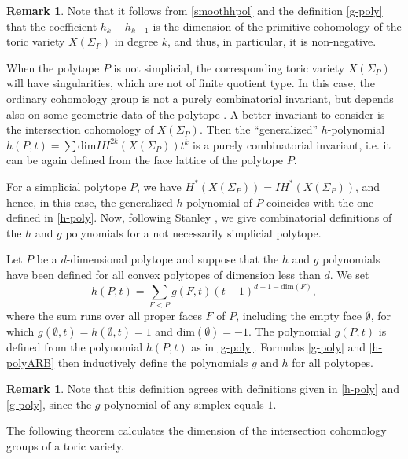 \documentclass[11pt]{article}
\theoremstyle{definition}
\newtheorem{rema}[theo]{Remark}
\numberwithin{equation}{section}
\begin{document}
\begin{rema}
	Note that it follows from \eqref{smoothhpol} and the definition 
	\eqref{g-poly} that the coefficient $h_k-h_{k-1}$ is the dimension of the 
	primitive cohomology of the toric variety $X(\Sigma_P)$ in degree $k$, and 
	thus, in particular, it is non-negative.
\end{rema}


When the polytope $P$ is not simplicial, the corresponding toric variety 
$X(\Sigma_P)$ will have singularities, which are not of finite quotient type. 
In this case, the 
ordinary cohomology group is not a purely combinatorial invariant, but depends 
also on some geometric data of the polytope \cite{McConnel}. A better invariant 
to consider is the intersection cohomology of $X(\Sigma_P)$.  
Then the ``generalized'' $h$-polynomial $h(P, t) = 
\sum\mathrm{dim}IH^{2k}(X(\Sigma_P))t^k$ is a purely combinatorial invariant, 
i.e.  it can be again defined from the face lattice of the polytope $P$.  

For a simplicial polytope $P$, we have $H^*(X(\Sigma_P))=IH^*(X(\Sigma_P))$, 
and hence, in this case,  the generalized $h$-polynomial of $P$ coincides with 
the one defined in \eqref{h-poly}. Now, following Stanley \cite{Stanley}, we give combinatorial definitions of the 
$h$ and $g$ polynomials for a not necessarily simplicial polytope.

Let $P$ be a $d$-dimensional polytope and suppose that the $h$ and $g$ polynomials have been defined for all convex polytopes of dimension less than $d$. We set
\begin{equation}\label{h-polyARB}
h(P, t) = \sum_{F<P}g(F,  t)(t-1)^{d-1-\mathrm{dim}(F)},
\end{equation}
where the sum runs over all proper faces $F$ of $P$, including the empty face 
$\emptyset$, for which $g(\emptyset,t) = h(\emptyset,t) = 1$ and 
$\mathrm{dim}(\emptyset) = -1$. The polynomial $g(P,t)$ is defined from the 
polynomial $h(P,t)$ as in \eqref{g-poly}. Formulas \eqref{g-poly} and 
\eqref{h-polyARB} then inductively define the polynomials $ g $ and $ h $ for 
all polytopes.

\begin{rema}
Note that this definition agrees with  definitions given in  \eqref{h-poly} and \eqref{g-poly}, since the $g$-polynomial of any simplex equals $1$.
\end{rema}

The following theorem calculates the dimension of the intersection cohomology groups of a toric variety.
\end{document}
